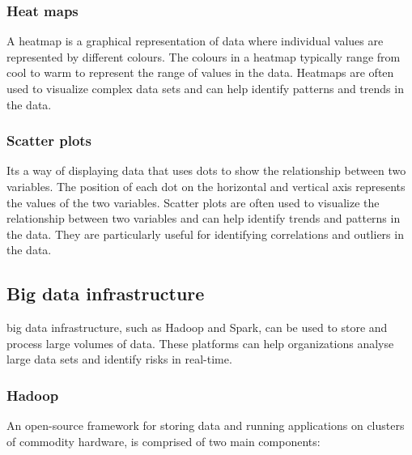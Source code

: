 \subsubsection{Heat maps}
A heatmap is a graphical representation of data where individual values are represented by different colours. The
colours in a heatmap typically range from cool to warm to represent the range of values in the data. Heatmaps are
often used to visualize complex data sets and can help identify patterns and trends in the data.

\subsubsection{Scatter plots}
Its a way of displaying data that uses dots to show the relationship between two variables.
The position of each dot on the horizontal and vertical axis represents the values of the two variables. Scatter
plots are often used to visualize the relationship between two variables and can help identify trends and patterns
in the data. They are particularly useful for identifying correlations and outliers in the data.

\subsection{Big data infrastructure}

big data infrastructure, such as Hadoop and Spark, can be used to store and process large volumes of data. These
platforms can help organizations analyse large data sets and identify risks in real-time.

\subsubsection{Hadoop}
An open-source framework for storing data and running applications on clusters of commodity hardware,
is comprised of two main components:


